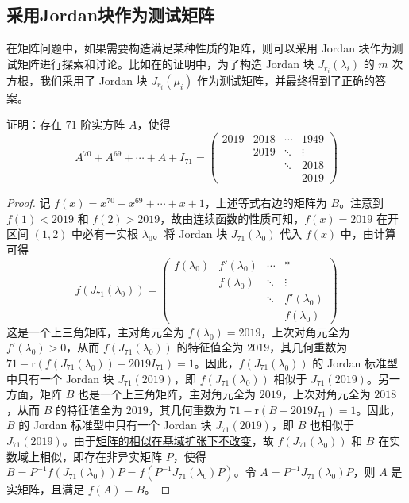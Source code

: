 \documentclass[../../main.tex]{subfiles}
\begin{document}
\subsection{采用Jordan块作为测试矩阵}

在矩阵问题中，如果需要构造满足某种性质的矩阵，则可以采用 Jordan 块作为测试矩阵进行探索和讨论。比如在的证明中，为了构造 Jordan 块 $J_{r_i}(\lambda_i)$ 的 $m$ 次方根，我们采用了 Jordan 块 $J_{r_i}(\mu_i)$ 作为测试矩阵，并最终得到了正确的答案。

\begin{example}
证明：存在 $71$ 阶实方阵 $A$，使得
\[
A^{70}+A^{69}+\cdots+A + I_{71}=
\begin{pmatrix}
2019 & 2018 & \cdots & 1949 \\
& 2019 & \ddots & \vdots \\
& & \ddots & 2018 \\
& & & 2019
\end{pmatrix}
\]
\end{example}
\begin{proof}
记 $f(x) = x^{70}+x^{69}+\cdots+x + 1$，上述等式右边的矩阵为 $B$。注意到 $f(1) < 2019$ 和 $f(2) > 2019$，故由连续函数的性质可知，$f(x)=2019$ 在开区间 $(1,2)$ 中必有一实根 $\lambda_0$。将 Jordan 块 $J_{71}(\lambda_0)$ 代入 $f(x)$ 中，由计算可得
\[
f(J_{71}(\lambda_0))=
\begin{pmatrix}
f(\lambda_0) & f'(\lambda_0) & \cdots & * \\
& f(\lambda_0) & \ddots & \vdots \\
& & \ddots & f'(\lambda_0) \\
& & & f(\lambda_0)
\end{pmatrix}
\]
这是一个上三角矩阵，主对角元全为 $f(\lambda_0)=2019$，上次对角元全为 $f'(\lambda_0)>0$，从而 $f(J_{71}(\lambda_0))$ 的特征值全为 $2019$，其几何重数为 $71 - \mathrm{r}(f(J_{71}(\lambda_0)) - 2019I_{71}) = 1$。因此，$f(J_{71}(\lambda_0))$ 的 Jordan 标准型中只有一个 Jordan 块 $J_{71}(2019)$，即 $f(J_{71}(\lambda_0))$ 相似于 $J_{71}(2019)$。另一方面，矩阵 $B$ 也是一个上三角矩阵，主对角元全为 $2019$，上次对角元全为 $2018$，从而 $B$ 的特征值全为 $2019$，其几何重数为 $71 - \mathrm{r}(B - 2019I_{71}) = 1$。因此，$B$ 的 Jordan 标准型中只有一个 Jordan 块 $J_{71}(2019)$，即 $B$ 也相似于 $J_{71}(2019)$。由于\hyperref[corollary:矩阵的相似关系在基域扩张下不变]{矩阵的相似在基域扩张下不改变}，故 $f(J_{71}(\lambda_0))$ 和 $B$ 在实数域上相似，即存在非异实矩阵 $P$，使得 $B = P^{-1}f(J_{71}(\lambda_0))P = f(P^{-1}J_{71}(\lambda_0)P)$。令 $A = P^{-1}J_{71}(\lambda_0)P$，则 $A$ 是实矩阵，且满足 $f(A) = B$。

\end{proof}
\end{document}
